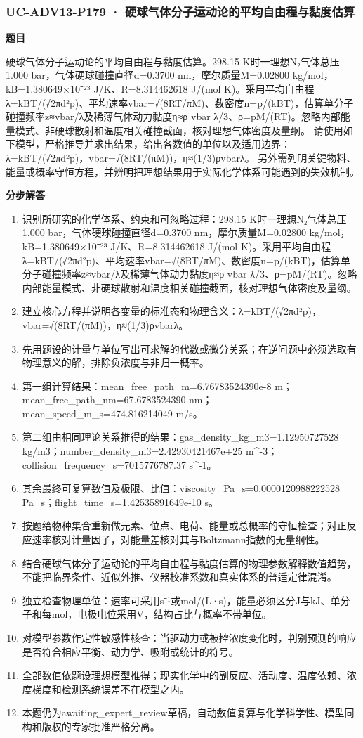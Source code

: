 \documentclass[UTF8,11pt,a4paper]{ctexart}
\begin{document}
\subsubsection*{UC-ADV13-P179 · 硬球气体分子运动论的平均自由程与黏度估算}
\noindent\textbf{题目}\par
硬球气体分子运动论的平均自由程与黏度估算。298.15 K时一理想N₂气体总压1.000 bar，气体硬球碰撞直径d=0.3700 nm，摩尔质量M=0.02800 kg/mol，kB=1.380649×10⁻²³ J/K、R=8.314462618 J/(mol K)。采用平均自由程λ=kBT/(√2πd²p)、平均速率vbar=√(8RT/πM)、数密度n=p/(kBT)，估算单分子碰撞频率z≈vbar/λ及稀薄气体动力黏度η≈ρ vbar λ/3、ρ=pM/(RT)。忽略内部能量模式、非硬球散射和温度相关碰撞截面，核对理想气体密度及量纲。 请使用如下模型，严格推导并求出结果，给出各数值的单位以及适用边界：λ=kBT/(√2πd²p)，vbar=√(8RT/(πM))，η≈(1/3)ρvbarλ。 另外需列明关键物料、能量或概率守恒方程，并辨明把理想结果用于实际化学体系可能遇到的失效机制。\par
\medskip\noindent\textbf{分步解答}
\begin{enumerate}
\item 识别所研究的化学体系、约束和可忽略过程：298.15 K时一理想N₂气体总压1.000 bar，气体硬球碰撞直径d=0.3700 nm，摩尔质量M=0.02800 kg/mol，kB=1.380649×10⁻²³ J/K、R=8.314462618 J/(mol K)。采用平均自由程λ=kBT/(√2πd²p)、平均速率vbar=√(8RT/πM)、数密度n=p/(kBT)，估算单分子碰撞频率z≈vbar/λ及稀薄气体动力黏度η≈ρ vbar λ/3、ρ=pM/(RT)。忽略内部能量模式、非硬球散射和温度相关碰撞截面，核对理想气体密度及量纲。
\item 建立核心方程并说明各变量的标准态和物理含义：λ=kBT/(√2πd²p)，vbar=√(8RT/(πM))，η≈(1/3)ρvbarλ。
\item 先用题设的计量与单位写出可求解的代数或微分关系；在逆问题中必须选取有物理意义的解，排除负浓度与非归一概率。
\item 第一组计算结果：mean\_free\_path\_m=6.76783524390e-8 m；mean\_free\_path\_nm=67.6783524390 nm；mean\_speed\_m\_s=474.816214049 m/s。
\item 第二组由相同理论关系推得的结果：gas\_density\_kg\_m3=1.12950727528 kg/m3；number\_density\_m3=2.42930421467e+25 m\textasciicircum{}-3；collision\_frequency\_s=7015776787.37 s\textasciicircum{}-1。
\item 其余最终可复算数值及极限、比值：viscosity\_Pa\_s=0.0000120988222528 Pa\_s；flight\_time\_s=1.42535891649e-10 s。
\item 按题给物种集合重新做元素、位点、电荷、能量或总概率的守恒检查；对正反应速率核对计量因子，对能量差核对其与Boltzmann指数的无量纲性。
\item 结合硬球气体分子运动论的平均自由程与黏度估算的物理参数解释数值趋势，不能把临界条件、近似外推、仪器校准系数和真实体系的普适定律混淆。
\item 独立检查物理单位：速率可采用s⁻¹或mol/(L·s)，能量必须区分J与kJ、单分子和每mol，电极电位采用V，结构占比与概率不带单位。
\item 对模型参数作定性敏感性核查：当驱动力或被控浓度变化时，判别预测的响应是否符合相应平衡、动力学、吸附或统计的符号。
\item 全部数值依题设理想模型推得；现实化学中的副反应、活动度、温度依赖、浓度梯度和检测系统误差不在模型之内。
\item 本题仍为awaiting\_expert\_review草稿，自动数值复算与化学科学性、模型同构和版权的专家批准严格分离。
\end{enumerate}
\end{document}
